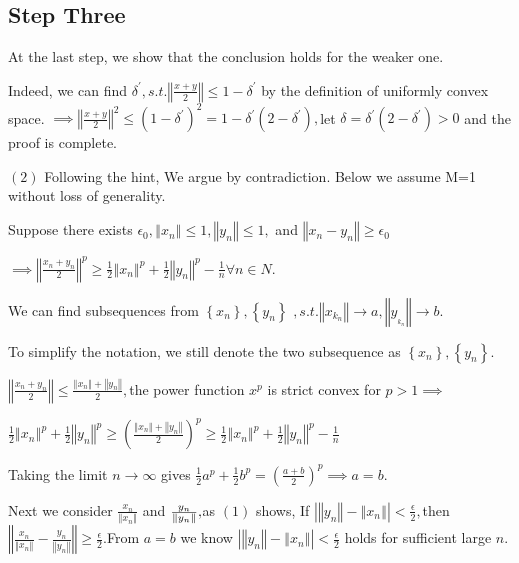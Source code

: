 \documentclass{article}
\begin{document}
\subsection{Step Three}

At the last step, we show that the conclusion holds for the weaker one.

Indeed, we can find $\delta ^{\prime },s.t.\left\Vert \frac{x+y}{2}%
\right\Vert \leq 1-\delta ^{\prime }$ by the definition of uniformly convex
space. $\implies \left\Vert \frac{x+y}{2}\right\Vert ^{2}\leq \left(
1-\delta ^{\prime }\right) ^{2}=1-\delta ^{\prime }\left( 2-\delta ^{\prime
}\right) ,$let $\delta =\delta ^{\prime }\left( 2-\delta ^{\prime }\right) >0
$ and the proof is complete.

$\left( 2\right) $ Following the hint, We argue by contradiction. Below we
assume M=1 without loss of generality.

Suppose there exists $\epsilon _{0},\left\Vert x_{n}\right\Vert \leq
1,\left\Vert y_{n}\right\Vert \leq 1,$ and $\left\Vert
x_{n}-y_{n}\right\Vert \geq \epsilon _{0}$

$\implies \left\Vert \frac{x_{n}+y_{n}}{2}\right\Vert ^{p}\geq \frac{1}{2}%
\left\Vert x_{n}\right\Vert ^{p}+\frac{1}{2}\left\Vert y_{n}\right\Vert ^{p}-%
\frac{1}{n}\forall n\in N.$

We can find subsequences from $\left\{ x_{n}\right\} ,\left\{ y_{n}\right\} $
$,s.t.\left\Vert x_{k_{n}}\right\Vert \rightarrow a,\left\Vert
y_{_{k_{n}}}\right\Vert \rightarrow b.$

To simplify the notation, we still denote the two subsequence as $\left\{
x_{n}\right\} ,\left\{ y_{n}\right\} .$

$\left\Vert \frac{x_{n}+y_{n}}{2}\right\Vert \leq \frac{\left\Vert
x_{n}\right\Vert +\left\Vert y_{n}\right\Vert }{2},$the power function $x^{p}
$ is strict convex for $p>1\implies $

$\frac{1}{2}\left\Vert x_{n}\right\Vert ^{p}+\frac{1}{2}\left\Vert
y_{n}\right\Vert ^{p}\geq \left( \frac{\left\Vert x_{n}\right\Vert
+\left\Vert y_{n}\right\Vert }{2}\right) ^{p}\geq \frac{1}{2}\left\Vert
x_{n}\right\Vert ^{p}+\frac{1}{2}\left\Vert y_{n}\right\Vert ^{p}-\frac{1}{n}
$

Taking the limit $n\rightarrow \infty $ gives $\frac{1}{2}a^{p}+\frac{1}{2}%
b^{p}=\left( \frac{a+b}{2}\right) ^{p}\implies a=b.$

Next we consider $\frac{x_{n}}{\left\Vert x_{n}\right\Vert }$ and $\frac{%
y_{n}}{\left\Vert y_{n}\right\Vert },$as $\left( 1\right) $ shows,  If $%
\left\vert \left\Vert y_{n}\right\Vert -\left\Vert x_{n}\right\Vert
\right\vert <\frac{\epsilon }{2},$then $\left\Vert \frac{x_{n}}{\left\Vert
x_{n}\right\Vert }-\frac{y_{n}}{\left\Vert y_{n}\right\Vert }\right\Vert
\geq \frac{\epsilon }{2}.$From $a=b$ we know  $\left\vert \left\Vert
y_{n}\right\Vert -\left\Vert x_{n}\right\Vert \right\vert <\frac{\epsilon }{2%
}$ holds for sufficient large $n.$ 
\end{document}
